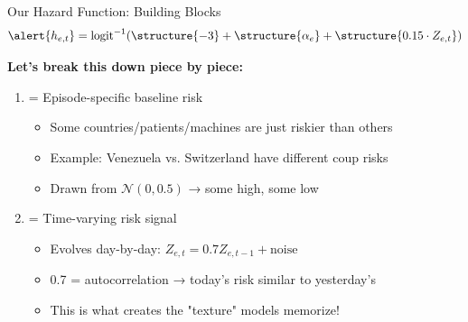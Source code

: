 \documentclass[aspectratio=169]{beamer}
\begin{document}
\begin{frame}{Our Hazard Function: Building Blocks}
\[\alert{h_{e,t}} = \text{logit}^{-1}(\structure{-3} + \structure{\alpha_e} + \structure{0.15 \cdot Z_{e,t}})\]

\textbf{Let's break this down piece by piece:}

\vspace{0.5em}
\begin{enumerate}
\item {} = Episode-specific baseline risk
\begin{itemize}
\item Some countries/patients/machines are just riskier than others
\item Example: Venezuela vs. Switzerland have different coup risks
\item Drawn from $\mathcal{N}(0, 0.5)$ → some high, some low
\end{itemize}

\vspace{0.3em}
\item {} = Time-varying risk signal
\begin{itemize}
\item Evolves day-by-day: $Z_{e,t} = 0.7 Z_{e,t-1} + \text{noise}$
\item \alert{0.7 = autocorrelation} → today's risk similar to yesterday's
\item This is what creates the "texture" models memorize!
\end{itemize}
\end{enumerate}
\end{frame}
\end{document}
